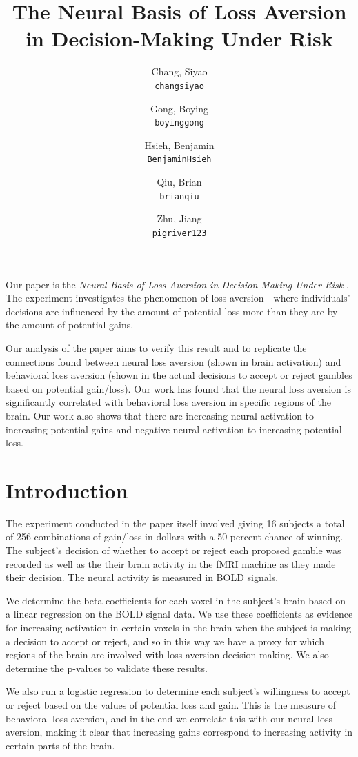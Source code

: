 \documentclass[11pt]{article}
\title{The Neural Basis of Loss Aversion in Decision-Making Under Risk}
\author{
  Chang, Siyao \\
  \texttt{changsiyao}
  \and
  Gong, Boying\\
  \texttt{boyinggong}
  \and
  Hsieh, Benjamin\\
  \texttt{BenjaminHsieh}
  \and
  Qiu, Brian\\
  \texttt{brianqiu}
  \and
  Zhu, Jiang\\
  \texttt{pigriver123}
}
\begin{document}
\maketitle

\par Our paper is the \textit{Neural Basis of Loss Aversion in 
Decision-Making Under Risk} \cite{Tom2007LossAversion}.
The experiment investigates the
phenomenon of loss aversion - where individuals' decisions are influenced by 
the amount of potential loss more than they are by the amount of potential 
gains. 

\par 
Our analysis of the paper aims to verify this result and to replicate the 
connections found between neural loss aversion (shown in brain activation) and 
behavioral loss aversion (shown in the actual decisions to accept or reject 
gambles based on potential gain/loss). Our work has found that the neural loss 
aversion is significantly correlated with behavioral loss aversion in specific 
regions of the brain. Our work also shows that there are increasing neural 
activation to increasing potential gains and negative neural activation to 
increasing potential loss.

\section{Introduction}
The experiment conducted in the paper itself involved giving 16 subjects a 
total of 256 combinations of gain/loss in dollars with a 50 percent chance of 
winning. The subject's decision of whether to accept or reject each proposed 
gamble was recorded as well as the their brain activity in the fMRI machine as 
they made their decision. The neural activity is measured in BOLD signals.

\par 
We determine the beta coefficients for each voxel in the subject's brain based 
on a linear regression on the BOLD signal data. We use these coefficients as 
evidence for increasing activation in certain voxels in the brain when the 
subject is making a decision to accept or reject, and so in this way we have a 
proxy for which regions of the brain are involved with loss-aversion 
decision-making. We also determine the p-values to validate these results.

\par 
We also run a logistic regression to determine each subject's willingness to 
accept or reject based on the values of potential loss and gain. This is the 
measure of behavioral loss aversion, and in the end we correlate this with our 
neural loss aversion, making it clear that increasing gains correspond to 
increasing activity in certain parts of the brain.  
\end{document}
